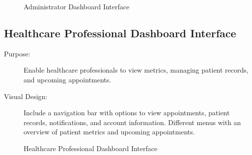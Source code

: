 \documentclass[12pt, titlepage]{article}
\begin{document}
\begin{figure}[h!]
    \centering
    \caption{Administrator Dashboard Interface}
    \label{fig:admin-interface}
\end{figure}

\newpage{}

\subsection{Healthcare Professional Dashboard Interface}
\begin{description}
    \item[Purpose:]Enable healthcare professionals to view metrics, managing patient records, and upcoming appointments.

    \item[Visual Design:]Include a navigation bar with options to view appointments, patient records, notifications, and account information. Different menus with an overview of patient metrics and upcoming appointments.
    
\end{description}

\begin{figure}[h!]
    \centering
    \caption{Healthcare Professional Dashboard Interface}
    \label{fig:healthcare-interface-1}
\end{figure}
\end{document}
